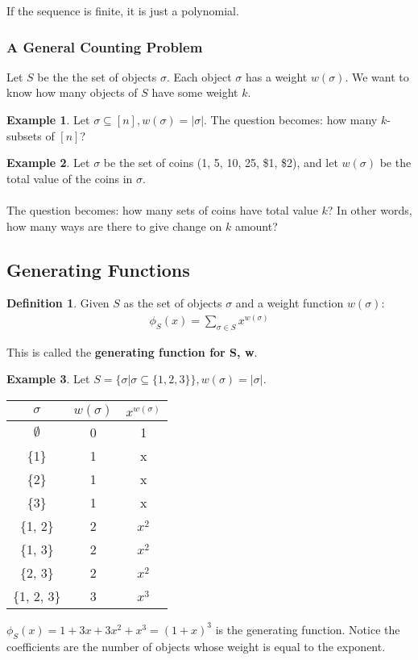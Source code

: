 \documentclass[]{article}
\theoremstyle{definition}
\newtheorem{defn}{Definition}[section]
\newtheorem{ex}{Example}[section]
\begin{document}
			If the sequence is finite, it is just a polynomial.
			
			\subsubsection{A General Counting Problem}
				Let $S$ be the the set of objects $\sigma$. Each object $\sigma$ has a weight $w(\sigma)$. We want to know how many objects of $S$ have some weight $k$.
				
				\begin{ex}
					Let $\sigma \subseteq [n], w(\sigma) = |\sigma|$. The question becomes: how many $k$-subsets of $[n]$?
				\end{ex}
				
				\begin{ex}
					Let $\sigma$ be the set of coins (1\cent, 5\cent, 10\cent, 25\cent, \$1, \$2), and let $w(\sigma)$ be the total value of the coins in $\sigma$.
					\\ \\
					The question becomes: how many sets of coins have total value $k$? In other words, how many ways are there to give change on $k$ amount?
				\end{ex}
		\subsection{Generating Functions}
			\begin{defn}
				Given $S$ as the set of objects $\sigma$ and a weight function $w(\sigma)$:
				\begin{align*}
					\phi_S(x) = \sum_{\sigma \in S} x^{w(\sigma)}
				\end{align*}
				
				This is called the \textbf{generating function for S, w}.
			\end{defn}
			
			\begin{ex}
				Let $S = \{ \sigma | \sigma \subseteq \{1, 2, 3\} \}, w(\sigma) = |\sigma|$.
				
				\begin{center}
					\begin{tabular}{c|c|c}
						$\sigma$ & $w(\sigma)$ & $x^{w(\sigma)}$ \\ \hline
						$\emptyset$ & 0 & 1 \\
						\{1\} & 1 & x \\
						\{2\} & 1 & x \\
						\{3\} & 1 & x \\
						\{1, 2\} & 2 & $x^2$ \\
						\{1, 3\} & 2 & $x^2$ \\
						\{2, 3\} & 2 & $x^2$ \\
						\{1, 2, 3\} & 3 & $x^3$ \\
					\end{tabular}
				\end{center}
				
				$\phi_S(x) = 1 + 3x + 3x^2 + x^3 = (1 + x)^3$ is the generating function. Notice the coefficients are the number of objects whose weight is equal to the exponent.
			\end{ex}
			
\end{document}
